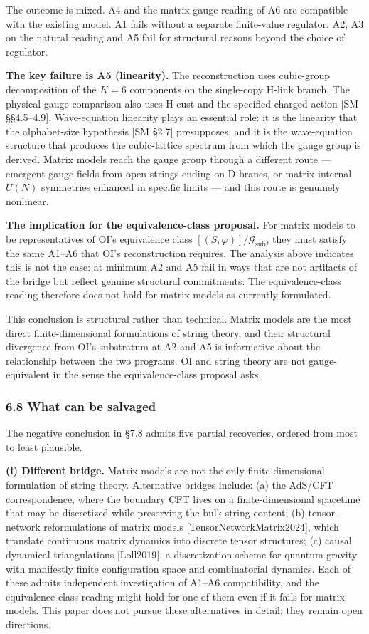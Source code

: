 \documentclass[
]{article}
\begin{document}
The outcome is mixed. A4 and the matrix-gauge reading of A6 are
compatible with the existing model. A1 fails without a separate
finite-value regulator. A2, A3 on the natural reading and A5 fail for
structural reasons beyond the choice of regulator.

\textbf{The key failure is A5 (linearity).} The reconstruction uses
cubic-group decomposition of the \(K = 6\) components on the single-copy
H-link branch. The physical gauge comparison also uses H-cust and the
specified charged action {[}SM §§4.5--4.9{]}. Wave-equation linearity
plays an essential role: it is the linearity that the alphabet-size
hypothesis {[}SM §2.7{]} presupposes, and it is the wave-equation
structure that produces the cubic-lattice spectrum from which the gauge
group is derived. Matrix models reach the gauge group through a
different route --- emergent gauge fields from open strings ending on
D-branes, or matrix-internal \(U(N)\) symmetries enhanced in specific
limits --- and this route is genuinely nonlinear.

\textbf{The implication for the equivalence-class proposal.} For matrix
models to be representatives of OI's equivalence class
\([(S, \varphi)]/\mathcal{G}_{\text{sub}}\), they must satisfy the same
A1--A6 that OI's reconstruction requires. The analysis above indicates
this is not the case: at minimum A2 and A5 fail in ways that are not
artifacts of the bridge but reflect genuine structural commitments. The
equivalence-class reading therefore does not hold for matrix models as
currently formulated.

This conclusion is structural rather than technical. Matrix models are
the most direct finite-dimensional formulations of string theory, and
their structural divergence from OI's substratum at A2 and A5 is
informative about the relationship between the two programs. OI and
string theory are not gauge-equivalent in the sense the
equivalence-class proposal asks.

\hypertarget{what-can-be-salvaged}{%
\subsubsection{6.8 What can be salvaged}\label{what-can-be-salvaged}}

The negative conclusion in §7.8 admits five partial recoveries, ordered
from most to least plausible.

\textbf{(i) Different bridge.} Matrix models are not the only
finite-dimensional formulation of string theory. Alternative bridges
include: (a) the AdS/CFT correspondence, where the boundary CFT lives on
a finite-dimensional spacetime that may be discretized while preserving
the bulk string content; (b) tensor-network reformulations of matrix
models {[}TensorNetworkMatrix2024{]}, which translate continuous matrix
dynamics into discrete tensor structures; (c) causal dynamical
triangulations {[}Loll2019{]}, a discretization scheme for quantum
gravity with manifestly finite configuration space and combinatorial
dynamics. Each of these admits independent investigation of A1--A6
compatibility, and the equivalence-class reading might hold for one of
them even if it fails for matrix models. This paper does not pursue
these alternatives in detail; they remain open directions.
\end{document}
